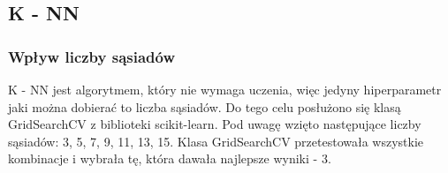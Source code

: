 \subsection{K - NN}\label{subsec:dobor_hiperparametrow_knn}
\subsubsection{Wpływ liczby sąsiadów}\label{subsubsec:liczba_sasiadow}
K - NN jest algorytmem, który nie wymaga uczenia, więc jedyny hiperparametr jaki można dobierać to liczba sąsiadów.
Do tego celu posłużono się klasą GridSearchCV z biblioteki scikit-learn.
Pod uwagę wzięto następujące liczby sąsiadów: 3, 5, 7, 9, 11, 13, 15. Klasa GridSearchCV
przetestowała wszystkie kombinacje i wybrała tę, która dawała najlepsze wyniki - 3.